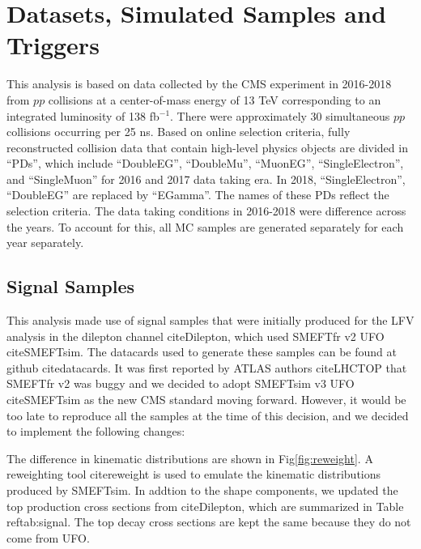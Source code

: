 \chapter{Datasets, Simulated Samples and Triggers}
\label{chap:Samples}

This analysis is based on data collected by the \ac{CMS} experiment in 2016-2018 from $pp$ collisions at a center-of-mass energy of 13 TeV corresponding to an integrated luminosity of 138 fb$^{-1}$. There were approximately 30 simultaneous $pp$ collisions occurring per 25 ns. Based on online selection criteria, fully reconstructed collision data that contain high-level physics objects are divided in ``\acp{PD}'', which include ``DoubleEG'', ``DoubleMu'', ``MuonEG'', ``SingleElectron'', and ``SingleMuon'' for 2016 and 2017 data taking era. In 2018, ``SingleElectron'', ``DoubleEG'' are replaced by ``EGamma''. The names of these \acp{PD} reflect the selection criteria. The data taking conditions in 2016-2018 were difference across the years. To account for this, all \ac{MC} samples are generated separately for each year separately. 
\section{Signal Samples}
\label{sec:Signals}

This analysis made use of signal samples that were initially produced for the LFV analysis in the dilepton channel cite{Dilepton}, which used SMEFTfr v2 UFO cite{SMEFTsim}. The datacards used to generate these samples can be found at github cite{datacards}. It was first reported by ATLAS authors cite{LHCTOP} that SMEFTfr v2 was buggy and we decided to adopt SMEFTsim v3 UFO cite{SMEFTsim} as the new CMS standard moving forward. However, it would be too late to reproduce all the samples at the time of this decision, and we decided to implement the following changes: 

The difference in kinematic distributions are shown in Fig\ref{fig:reweight}. A reweighting tool cite{reweight} is used to emulate the kinematic distributions produced by SMEFTsim. In addtion to the shape components, we updated the top production cross sections from cite{Dilepton}, which are summarized in Table ref{tab:signal}. The top decay cross sections are kept the same because they do not come from UFO.


